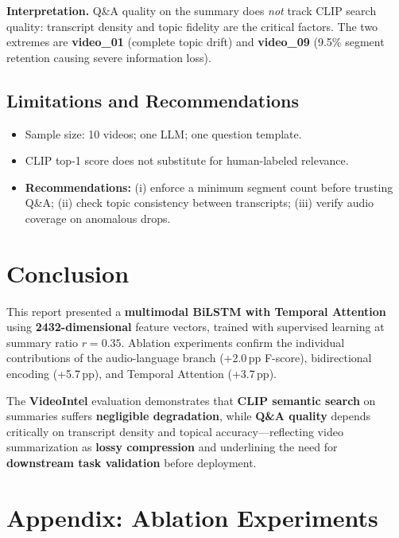\documentclass[10pt,conference]{IEEEtran}
\begin{document}
\textbf{Interpretation.} Q\&A quality on the summary does \emph{not} track
CLIP search quality: transcript density and topic fidelity are the critical
factors. The two extremes are \textbf{video\_01} (complete topic drift) and
\textbf{video\_09} (9.5\% segment retention causing severe information loss).

\subsection{Limitations and Recommendations}

\begin{itemize}
  \item Sample size: 10 videos; one LLM; one question template.
  \item CLIP top-1 score does not substitute for human-labeled relevance.
  \item \textbf{Recommendations:} (i) enforce a minimum segment count before
        trusting Q\&A; (ii) check topic consistency between transcripts;
        (iii) verify audio coverage on anomalous drops.
\end{itemize}

\section{Conclusion}

This report presented a \textbf{multimodal BiLSTM with Temporal Attention}
using \textbf{2432-dimensional} feature vectors, trained with supervised
learning at summary ratio $r{=}0.35$. Ablation experiments confirm the
individual contributions of the audio-language branch (+2.0\,pp F-score),
bidirectional encoding (+5.7\,pp), and Temporal Attention (+3.7\,pp).

The \textbf{VideoIntel} evaluation demonstrates that \textbf{CLIP semantic
search} on summaries suffers \textbf{negligible degradation}, while
\textbf{Q\&A quality} depends critically on transcript density and topical
accuracy---reflecting video summarization as \textbf{lossy compression} and
underlining the need for \textbf{downstream task validation} before deployment.

\section*{Appendix: Ablation Experiments}
\end{document}
